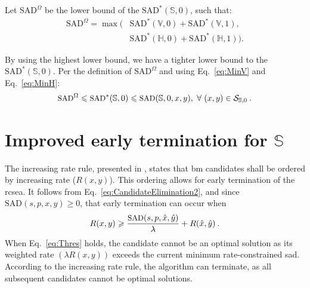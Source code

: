 \documentclass{article}
\newcommand{\eq}[1]{Eq.~\eqref{#1}}
\newcommand{\minsad}{
    \text{SAD}^*
}
\newcommand{\lowersad}{
    \text{SAD}^\Omega
}
\begin{document}
Let $\lowersad$ be the lower bound of the $\minsad(\mathbb{S},0)$, such that:
{\small
\begin{align}
    \lowersad =
    \max \big(
        & \minsad(\mathbb{V},0) + \minsad(\mathbb{V},1), \nonumber \\
        & \minsad(\mathbb{H},0) + \minsad(\mathbb{H},1)
    \big).
\end{align}
}%

By using the highest lower bound, we have a tighter lower bound to the $\minsad(\mathbb{S},0)$. Per the definition of $\lowersad$ and using \eq{eq:MinV} and \eq{eq:MinH}:
\begin{equation}
\small{
\lowersad \leqslant \minsad(\mathbb{S},0) \leqslant \text{SAD}(\mathbb{S},0,x,y),~\forall~ (x,y) \in  \mathcal{S}_{\mathbb{S},0} \:.
}
\label{eq:LowerBound}
\end{equation}


\section{Improved early termination for $\mathbb{S}$}
\label{sec:LowerBound}
\vspace{-0.5em}

The increasing rate rule, presented in \cite{Trud14}, states that \gls{bm} candidates shall be ordered by increasing rate ($R(x,y)$). This ordering allows for early termination of the \gls{rcsea}. It follows from \eq{eq:CandidateElimination2}, and since $\text{SAD}(s,p,x,y)\geqslant 0$, that early termination can occur when
\begin{equation}
\small{
    R(x,y) \geqslant \frac{\text{SAD}(s,p,\hat{x},\hat{y})}{\lambda} + R(\hat{x},\hat{y}) \:.
}
\label{eq:Thres}
\end{equation}
When \eq{eq:Thres} holds, the candidate cannot be an optimal solution as its weighted rate $(\lambda R(x,y))$ exceeds the current minimum rate-constrained \gls{sad}. According to the increasing rate rule, the algorithm can terminate, as all subsequent candidates cannot be optimal solutions. 
\end{document}
